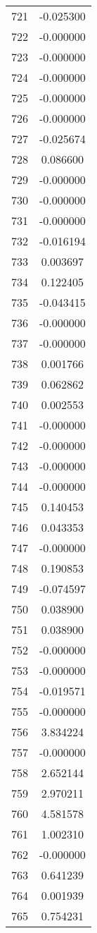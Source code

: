 \documentclass[12pt]{article}
\begin{document}
\begin{longtable}{@{}cc@{}}
721 & -0.025300 \\
722 & -0.000000 \\
723 & -0.000000 \\
724 & -0.000000 \\
725 & -0.000000 \\
726 & -0.000000 \\
727 & -0.025674 \\
728 & 0.086600 \\
729 & -0.000000 \\
730 & -0.000000 \\
731 & -0.000000 \\
732 & -0.016194 \\
733 & 0.003697 \\
734 & 0.122405 \\
735 & -0.043415 \\
736 & -0.000000 \\
737 & -0.000000 \\
738 & 0.001766 \\
739 & 0.062862 \\
740 & 0.002553 \\
741 & -0.000000 \\
742 & -0.000000 \\
743 & -0.000000 \\
744 & -0.000000 \\
745 & 0.140453 \\
746 & 0.043353 \\
747 & -0.000000 \\
748 & 0.190853 \\
749 & -0.074597 \\
750 & 0.038900 \\
751 & 0.038900 \\
752 & -0.000000 \\
753 & -0.000000 \\
754 & -0.019571 \\
755 & -0.000000 \\
756 & 3.834224 \\
757 & -0.000000 \\
758 & 2.652144 \\
759 & 2.970211 \\
760 & 4.581578 \\
761 & 1.002310 \\
762 & -0.000000 \\
763 & 0.641239 \\
764 & 0.001939 \\
765 & 0.754231 \\

\end{longtable}
\end{document}
